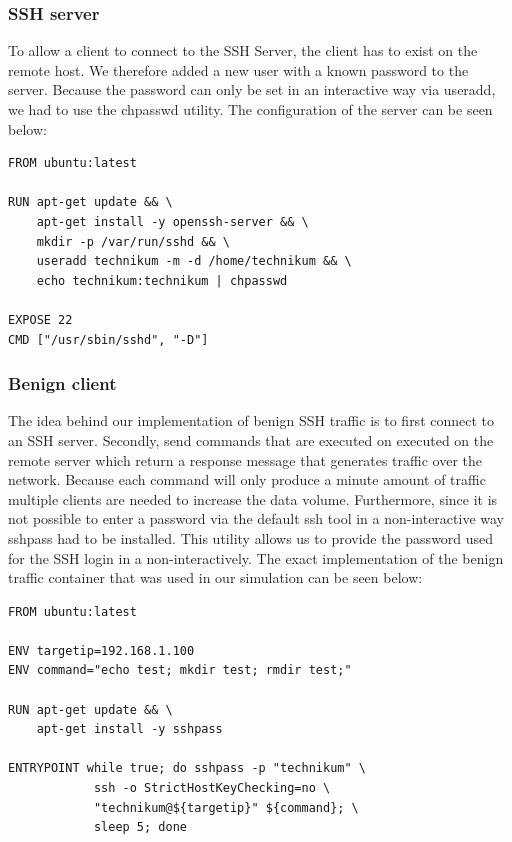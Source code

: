 \documentclass[conference]{IEEEtran}
\begin{document}
\subsubsection{SSH server}
To allow a client to connect to the SSH Server, the client has to exist on the remote host. We therefore added a new user with a known password to the server. Because the password can only be set in an interactive way via useradd, we had to use the chpasswd utility. 
The configuration of the server can be seen below: 

\begin{lstlisting}[basicstyle=\footnotesize]
FROM ubuntu:latest

RUN apt-get update && \ 
    apt-get install -y openssh-server && \
    mkdir -p /var/run/sshd && \
    useradd technikum -m -d /home/technikum && \
    echo technikum:technikum | chpasswd

EXPOSE 22
CMD ["/usr/sbin/sshd", "-D"]
\end{lstlisting}

\subsubsection{Benign client}
The idea behind our implementation of benign SSH traffic is to first connect to an SSH server. Secondly, send commands that are executed on executed on the remote server which return a response message that generates traffic over the network. Because each command will only produce a minute amount of traffic multiple clients are needed to increase the data volume. Furthermore, since it is not possible to enter a password via the default ssh tool in a non-interactive way sshpass had to be installed. This utility allows us to provide the password used for the SSH login in a non-interactively. The exact implementation of the benign traffic container that was used in our simulation can be seen below:

\begin{lstlisting}[basicstyle=\footnotesize]
FROM ubuntu:latest

ENV targetip=192.168.1.100
ENV command="echo test; mkdir test; rmdir test;"

RUN apt-get update && \ 
    apt-get install -y sshpass
    
ENTRYPOINT while true; do sshpass -p "technikum" \ 
			ssh -o StrictHostKeyChecking=no \
			"technikum@${targetip}" ${command}; \
			sleep 5; done
\end{lstlisting}
\end{document}
